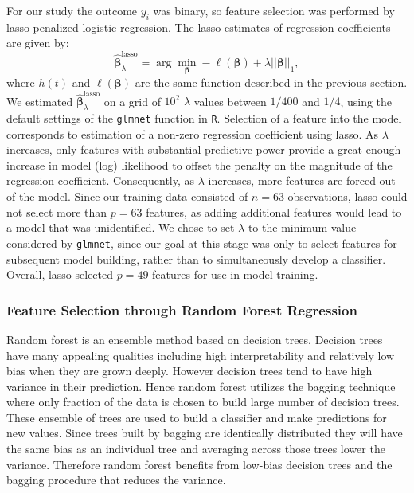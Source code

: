 \documentclass[a4paper]{article}
\begin{document}
For our study the outcome $y_{i}$ was binary, so feature selection was performed by lasso penalized logistic regression. The lasso estimates of regression coefficients are given by:
\begin{equation}
\bm{\hat{\beta}}_{\lambda}^{\text{lasso}} = \arg\min_{\bm{\beta}} -\ell(\bm{\beta}) + \lambda ||\bm{\beta}||_{1},
\end{equation}
where $h(t) $ and $\ell(\bm{\beta})$ are the same function described in the previous section. We estimated $\bm{\hat{\beta}}_{\lambda}^{\text{lasso}}$ on a grid of $10^{2}$ $\lambda$ values between $1/400$ and $1/4$, using the default settings of the \texttt{glmnet} function in \texttt{R}. Selection of a feature into the model corresponds to estimation of a non-zero regression coefficient using lasso. As $\lambda$ increases, only features with substantial predictive power provide a great enough increase in model (log) likelihood to offset the penalty on the magnitude of the regression coefficient. Consequently, as $\lambda$ increases, more features are forced out of the model. Since our training data consisted of $n=63$ observations, lasso could not select more than $p=63$ features, as adding additional features would lead to a model that was unidentified. We chose to set $\lambda$ to the minimum value considered by \texttt{glmnet}, since our goal at this stage was only to select features for subsequent model building, rather than to simultaneously develop a classifier. Overall, lasso selected $p=49$ features for use in model training. 

\subsubsection{Feature Selection through Random Forest Regression}
Random forest is an ensemble method based on decision trees. Decision trees have many appealing qualities including high interpretability and relatively low bias when they are grown deeply. However decision trees tend to have high variance in their prediction. Hence random forest utilizes the bagging technique where only fraction of the data is chosen to build large number of decision trees. These ensemble of trees are used to build a classifier and make predictions for new values. Since trees built by bagging are identically distributed they will have the same bias as an individual tree and averaging across those trees lower the variance. Therefore random forest benefits from low-bias decision trees and the bagging procedure that reduces the variance. \cite{friedman2001elements}
\end{document}
